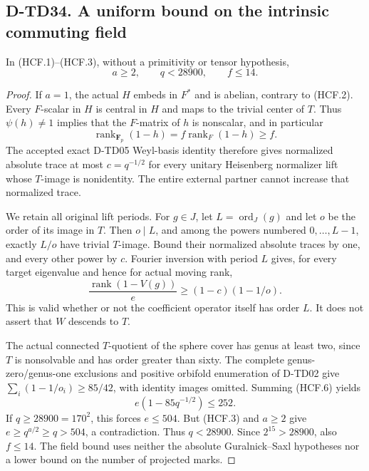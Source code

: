 \subsection*{D-TD34. A uniform bound on the intrinsic commuting field}

\begin{proposition}[D-TD34]
In (HCF.1)--(HCF.3), without a primitivity or tensor hypothesis,
\[
                  a\ge2,\qquad q<28900,
                  \qquad f\le14.
 \tag{HCF.4}
\]
\end{proposition}

\begin{proof}
If $a=1$, the actual $H$ embeds in $F^*$ and is abelian, contrary
to (HCF.2).  Every $F$-scalar in $H$ is central in $H$ and maps
to the trivial center of $T$.  Thus $\psi(h)\ne1$ implies that
the $F$-matrix of $h$ is nonscalar, and in particular
\[
 \operatorname{rank}_{\mathbf F_p}(1-h)
       =f\operatorname{rank}_{F}(1-h)\ge f.
 \tag{HCF.5}
\]
The accepted exact D-TD05 Weyl-basis identity therefore gives
normalized absolute trace at most $c=q^{-1/2}$ for every unitary
Heisenberg normalizer lift whose $T$-image is nonidentity.  The
entire external partner cannot increase that normalized trace.

We retain all original lift periods.  For $g\in J$, let
$L=\operatorname{ord}_J(g)$ and let $o$ be the order of its
image in $T$.  Then $o\mid L$, and among the powers numbered
$0,\ldots,L-1$, exactly $L/o$ have trivial $T$-image.  Bound
their normalized absolute traces by one, and every other power
by $c$.  Fourier inversion with period $L$ gives, for every
target eigenvalue and hence for actual moving rank,
\[
 \frac{\operatorname{rank}(1-V(g))}{e}
                \ge(1-c)(1-1/o).
 \tag{HCF.6}
\]
This is valid whether or not the coefficient operator itself
has order $L$.  It does not assert that $W$ descends to $T$.

The actual connected $T$-quotient of the sphere cover has genus
at least two, since $T$ is nonsolvable and has order greater
than sixty.  The complete genus-zero/genus-one exclusions and
positive orbifold enumeration of D-TD02 give
$\sum_i(1-1/o_i)\ge85/42$, with identity images omitted.
Summing (HCF.6) yields
\[
                  e(1-85q^{-1/2})\le252.
 \tag{HCF.7}
\]
If $q\ge28900=170^2$, this forces $e\le504$.  But (HCF.3)
and $a\ge2$ give $e\ge q^{a/2}\ge q>504$, a contradiction.
Thus $q<28900$.  Since $2^{15}>28900$, also $f\le14$.
The field bound uses neither the absolute Guralnick--Saxl
hypotheses nor a lower bound on the number of projected marks.
\end{proof}

